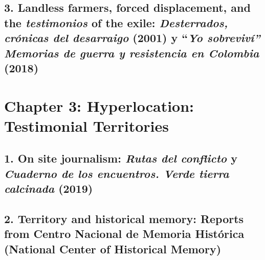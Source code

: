\documentclass[
  11pt,
,
onecolumn,
openany
]{book}
\begin{document}
\hypertarget{landless-farmers-forced-displacement-and-the-testimonios-of-the-exile-desterrados-cruxf3nicas-del-desarraigo-2001-y-yo-sobrevivuxed-memorias-de-guerra-y-resistencia-en-colombia-2018}{%
\subsection{\texorpdfstring{3. Landless farmers, forced displacement, and the
\emph{testimonios} of the exile: \emph{Desterrados, crónicas del desarraigo}
(2001) y ``\emph{Yo sobreviví'' Memorias de guerra y resistencia en Colombia}
(2018)~}{3. Landless farmers, forced displacement, and the testimonios of the exile: Desterrados, crónicas del desarraigo (2001) y ``Yo sobreviví'' Memorias de guerra y resistencia en Colombia (2018)~}}\label{landless-farmers-forced-displacement-and-the-testimonios-of-the-exile-desterrados-cruxf3nicas-del-desarraigo-2001-y-yo-sobrevivuxed-memorias-de-guerra-y-resistencia-en-colombia-2018}}

\hypertarget{chapter-3-hyperlocation-testimonial-territories}{%
\section{\texorpdfstring{\textbf{Chapter 3: Hyperlocation: Testimonial
Territories}}{Chapter 3: Hyperlocation: Testimonial Territories}}\label{chapter-3-hyperlocation-testimonial-territories}}

\hypertarget{on-site-journalism-rutas-del-conflicto-y-cuaderno-de-los-encuentros.-verde-tierra-calcinada-2019}{%
\subsection{\texorpdfstring{1. On site journalism: \emph{Rutas del conflicto}
y \emph{Cuaderno de los encuentros. Verde tierra calcinada}
(2019)\emph{~}}{1. On site journalism: Rutas del conflicto y Cuaderno de los encuentros. Verde tierra calcinada (2019)~}}\label{on-site-journalism-rutas-del-conflicto-y-cuaderno-de-los-encuentros.-verde-tierra-calcinada-2019}}

\hypertarget{territory-and-historical-memory-reports-from-centro-nacional-de-memoria-histuxf3rica-national-center-of-historical-memory}{%
\subsection{2. Territory and historical memory: Reports from Centro Nacional
de Memoria Histórica (National Center of Historical
Memory)}\label{territory-and-historical-memory-reports-from-centro-nacional-de-memoria-histuxf3rica-national-center-of-historical-memory}}
\end{document}
